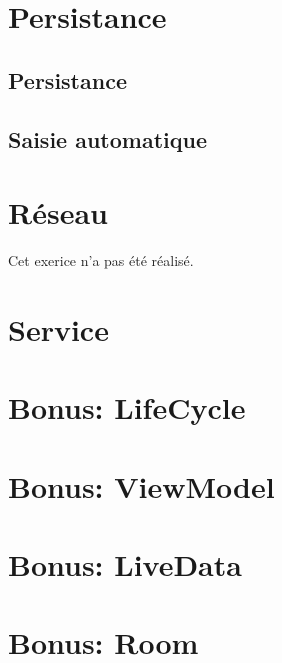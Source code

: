 \documentclass[a4paper]{article}
\begin{document}
\begin{multicols}{2}
        \section{Persistance}
            \subsection{Persistance}
            \subsection{Saisie automatique}
        \section{Réseau}
            Cet exerice n'a pas été réalisé.
        \section{Service}
        \section{Bonus: LifeCycle}
        \section{Bonus: ViewModel}
        \section{Bonus: LiveData}
        \section{Bonus: Room}
    \end{multicols}
\end{document}
